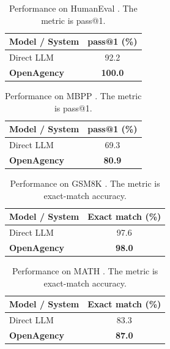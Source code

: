 \documentclass{article} %
\begin{document}
\begin{table}[t]
\caption{Performance on HumanEval \citep{chen2021humaneval}. The metric is pass@1.}
\label{tab:humaneval}
\begin{center}\small
\begin{tabular}{lc}
\toprule
\textbf{Model / System} & \textbf{pass@1 (\%)} \\
\midrule
Direct LLM & 92.2 \\
\rowcolor{gray!12}
\textbf{OpenAgency} & \textbf{100.0} \\
\bottomrule
\end{tabular}\end{center}
\end{table}

\begin{table}[t]
\caption{Performance on MBPP \citep{austin2021mbpp}. The metric is pass@1.}
\label{tab:mbpp}
\begin{center}\small
\begin{tabular}{lc}
\toprule
\textbf{Model / System} & \textbf{pass@1 (\%)} \\
\midrule
Direct LLM & 69.3 \\
\rowcolor{gray!12}
\textbf{OpenAgency} & \textbf{80.9} \\
\bottomrule
\end{tabular}\end{center}
\end{table}

\begin{table}[t]
\caption{Performance on GSM8K \citep{cobbe2021gsm8k}. The metric is exact-match accuracy.}
\label{tab:gsm8k}
\begin{center}\small
\begin{tabular}{lc}
\toprule
\textbf{Model / System} & \textbf{Exact match (\%)} \\
\midrule
Direct LLM & 97.6 \\
\rowcolor{gray!12}
\textbf{OpenAgency} & \textbf{98.0} \\
\bottomrule
\end{tabular}\end{center}
\end{table}

\begin{table}[t]
\caption{Performance on MATH \citep{hendrycks2021math}. The metric is exact-match accuracy.}
\label{tab:math}
\begin{center}\small
\begin{tabular}{lc}
\toprule
\textbf{Model / System} & \textbf{Exact match (\%)} \\
\midrule
Direct LLM & 83.3 \\
\rowcolor{gray!12}
\textbf{OpenAgency} & \textbf{87.0} \\
\bottomrule
\end{tabular}\end{center}
\end{table}
\end{document}
